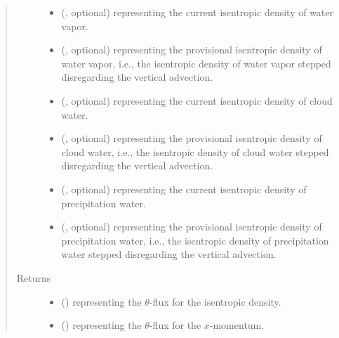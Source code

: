 \documentclass[letterpaper,10pt,english]{sphinxmanual}
\begin{document}
\begin{fulllineitems}
\begin{fulllineitems}
\begin{quote}
\begin{description}
\begin{itemize}
\item {} 
 (, optional) \textendash{}  representing the current isentropic density of water vapor.

\item {} 
 (, optional) \textendash{}  representing the provisional isentropic density of water vapor,
i.e., the isentropic density of water vapor stepped disregarding the vertical advection.

\item {} 
 (, optional) \textendash{}  representing the current isentropic density of cloud water.

\item {} 
 (, optional) \textendash{}  representing the provisional isentropic density of cloud water,
i.e., the isentropic density of cloud water stepped disregarding the vertical advection.

\item {} 
 (, optional) \textendash{}  representing the current isentropic density of precipitation water.

\item {} 
 (, optional) \textendash{}  representing the provisional isentropic density of precipitation water,
i.e., the isentropic density of precipitation water stepped disregarding the vertical advection.

\end{itemize}

\item[{Returns}] \leavevmode
\begin{itemize}
\item {} 
 () \textendash{}  representing the \(\theta\)-flux for the isentropic density.

\item {} 
 () \textendash{}  representing the \(\theta\)-flux for the \(x\)-momentum.


\end{itemize}
\end{description}
\end{quote}
\end{fulllineitems}
\end{fulllineitems}
\end{document}
